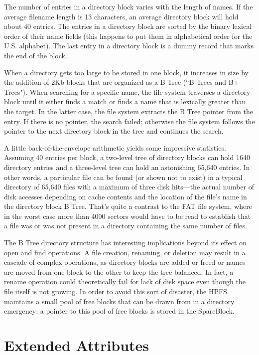 The number of entries in a directory block varies with the length of names.
If the average filename length is 13 characters, an average directory block
will hold about 40 entries.  The entries in a directory block are sorted by
the binary lexical order of their name fields (this happens to put them in
alphabetical order for the U.S. alphabet).  The last entry in a directory
block is a dummy record that marks the end of the block.
 
When a directory gets too large to be stored in one block, it increases in
size by the addition of 2Kb blocks that are organized as a B Tree (``B Trees and
B+ Trees").  When searching for a specific name, the file system traverses a
directory block until it either finds a match or finds a name that is
lexically greater than the target.  In the latter case, the file system
extracts the B Tree pointer from the entry.  If there is no pointer, the
search failed; otherwise the file system follows the pointer to the next
directory block in the tree and continues the search.
 
A little back-of-the-envelope arithmetic yields some impressive statistics.
Assuming 40 entries per block, a two-level tree of directory blocks can hold
1640 directory entries and a three-level tree can hold an astonishing 65,640
entries.  In other words, a particular file can be found (or shown not to
exist) in a typical directory of 65,640 files with a maximum of three disk
hits---the actual number of disk accesses depending on cache contents and the
location of the file's name in the directory block B Tree.  That's quite a
contrast to the FAT file system, where in the worst case more than 4000
sectors would have to be read to establish that a file was or was not present
in a directory containing the same number of files.
 
The B Tree directory structure has interesting implications beyond its effect
on open and find operations.  A file creation, renaming, or deletion may
result in a cascade of complex operations, as directory blocks are added or
freed or names are moved from one block to the other to keep the tree
balanced.  In fact, a rename operation could theoretically fail for lack of
disk space even though the file itself is not growing.  In order to avoid
this sort of disaster, the HPFS maintains a small pool of free blocks that
can be drawn from in a directory emergency; a pointer to this pool of free
blocks is stored in the SpareBlock.
 
\section{\heads Extended Attributes}
 
